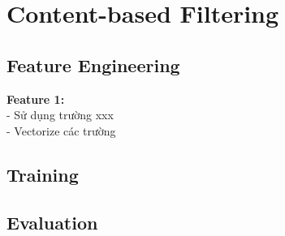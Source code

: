 \section{Content-based Filtering}
\subsection{Feature Engineering}
\textbf{Feature 1:}\\
- Sử dụng trường xxx\\
- Vectorize các trường\\
\subsection{Training}
\subsection{Evaluation}